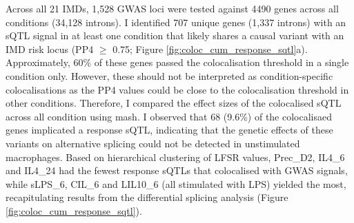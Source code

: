 Across all 21 IMDs, 1,528 GWAS loci were tested against 4490 genes across all conditions (34,128 introns). I identified 707 unique genes (1,337 introns) with an sQTL signal in at least one condition that likely shares a causal variant with an IMD risk locus (PP4 $\geq$ 0.75; Figure \ref{fig:coloc_cum_response_sqtl}a). Approximately, 60\% of these genes passed the colocalisation threshold in a single condition only. However, these should not be interpreted as condition-specific colocalisations as the PP4 values could be close to the colocalisation threshold in other conditions. Therefore, I compared the effect sizes of the colocalised sQTL across all condition using mash. I observed that 68 (9.6\%) of the colocalisaed genes implicated a response sQTL, indicating that the genetic effects of these variants on alternative splicing could not be detected in unstimulated macrophages. Based on hierarchical clustering of LFSR values, Prec\_D2, IL4\_6 and IL4\_24 had the fewest response sQTLs that colocalised with GWAS signals, while sLPS\_6, CIL\_6 and LIL10\_6 (all stimulated with LPS) yielded the most, recapitulating results from the differential splicing analysis (Figure \ref{fig:coloc_cum_response_sqtl}). \\

